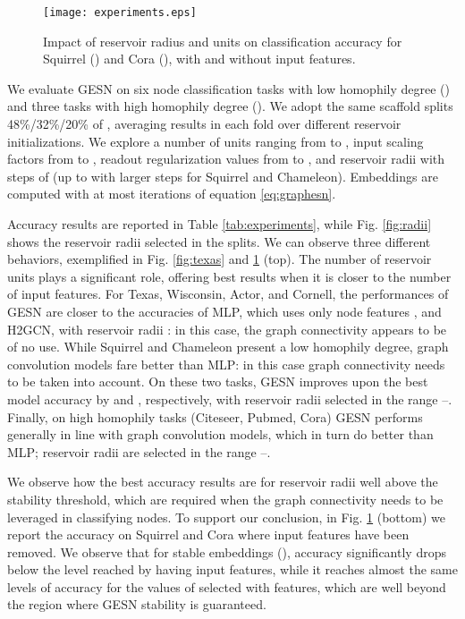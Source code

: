\documentclass{esannV2p}
\begin{document}
\begin{figure}\centering
  \texttt{[image: experiments.eps]}
  \caption{Impact of reservoir radius and units on classification accuracy for Squirrel () and Cora (), with and without input features.}
  \label{fig:experiments}
\end{figure}

We evaluate GESN on six node classification tasks with low homophily degree () and three tasks with high homophily degree ().
We adopt the same  scaffold splits 48\%/32\%/20\% of \cite{Zhu2020}, averaging results in each fold over  different reservoir initializations.
We explore a number of units ranging from  to , input scaling factors from  to , readout regularization values from  to , and reservoir radii  with steps of  (up to  with larger steps for Squirrel and Chameleon).
Embeddings are computed with at most  iterations of equation \eqref{eq:graphesn}.

Accuracy results are reported in Table \ref{tab:experiments}, while Fig. \ref{fig:radii} shows the reservoir radii selected in the  splits.
We can observe three different behaviors, exemplified in Fig. \ref{fig:texas} and  \ref{fig:experiments} (top).
The number of reservoir units plays a significant role, offering best results when it is closer to the number of input features.
For Texas, Wisconsin, Actor, and Cornell, the performances of GESN are closer to the accuracies of MLP, which uses only node features , and H2GCN, with reservoir radii : in this case, the graph connectivity appears to be of no use.
While Squirrel and Chameleon present a low homophily degree, graph convolution models fare better than MLP: in this case graph connectivity needs to be taken into account.
On these two tasks, GESN improves upon the best model accuracy by  and , respectively, with reservoir radii selected in the range --.
Finally, on high homophily tasks (Citeseer, Pubmed, Cora) GESN performs generally in line with graph convolution models, which in turn do better than MLP; reservoir radii are selected in the range --.

We observe how the best accuracy results are for reservoir radii well above the stability threshold, which are required when the graph connectivity needs to be leveraged in classifying nodes.
To support our conclusion, in Fig. \ref{fig:experiments} (bottom) we report the accuracy on Squirrel and Cora where input features have been removed.
We observe that for stable embeddings (), accuracy significantly drops below the level reached by having input features, while it reaches almost the same levels of accuracy for the values of  selected with features, which are well beyond the region where GESN stability is guaranteed.
\end{document}
